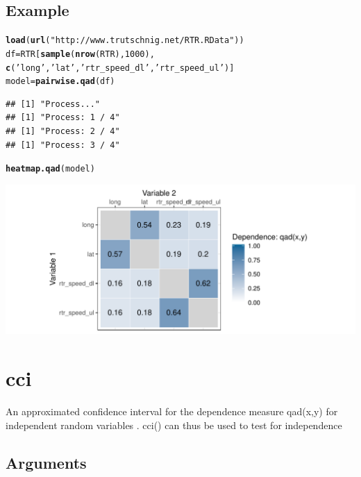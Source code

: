 \documentclass{scrartcl}\usepackage[]{graphicx}\usepackage[]{color}
\makeatletter
\def\maxwidth{ %
  \ifdim\Gin@nat@width>\linewidth
    \linewidth
  \else
    \Gin@nat@width
  \fi
}
\newcommand{\hlnum}[1]{\textcolor[rgb]{0.686,0.059,0.569}{#1}}%
\newcommand{\hlstr}[1]{\textcolor[rgb]{0.192,0.494,0.8}{#1}}%
\newcommand{\hlstd}[1]{\textcolor[rgb]{0.345,0.345,0.345}{#1}}%
\newcommand{\hlkwb}[1]{\textcolor[rgb]{0.69,0.353,0.396}{#1}}%
\newcommand{\hlkwd}[1]{\textcolor[rgb]{0.737,0.353,0.396}{\textbf{#1}}}%
\newenvironment{kframe}{%
 \def\at@end@of@kframe{}%
 \ifinner\ifhmode%
  \def\at@end@of@kframe{\end{minipage}}%
  \begin{minipage}{\columnwidth}%
 \fi\fi%
 \def\FrameCommand##1{\hskip\@totalleftmargin \hskip-\fboxsep
 \colorbox{shadecolor}{##1}\hskip-\fboxsep
     \hskip-\linewidth \hskip-\@totalleftmargin \hskip\columnwidth}%
 \MakeFramed {\advance\hsize-\width
   \@totalleftmargin\z@ \linewidth\hsize
   \@setminipage}}%
 {\par\unskip\endMakeFramed%
 \at@end@of@kframe}
\newenvironment{knitrout}{}{} %
\makeatother
\begin{document}
\subsection{Example}
\begin{knitrout}
\color{fgcolor}\begin{kframe}
\begin{alltt}
  \hlkwd{load}\hlstd{(}\hlkwd{url}\hlstd{(}\hlstr{"http://www.trutschnig.net/RTR.RData"}\hlstd{))}
  \hlstd{df} \hlkwb{=} \hlstd{RTR[}\hlkwd{sample}\hlstd{(}\hlkwd{nrow}\hlstd{(RTR),}\hlnum{1000}\hlstd{),}
           \hlkwd{c}\hlstd{(}\hlstr{'long'}\hlstd{,}\hlstr{'lat'}\hlstd{,}\hlstr{'rtr_speed_dl'}\hlstd{,}\hlstr{'rtr_speed_ul'}\hlstd{)]}
  \hlstd{model} \hlkwb{=} \hlkwd{pairwise.qad}\hlstd{(df)}
\end{alltt}
\begin{verbatim}
## [1] "Process..."
## [1] "Process: 1 / 4"
## [1] "Process: 2 / 4"
## [1] "Process: 3 / 4"
\end{verbatim}
\begin{alltt}
  \hlkwd{heatmap.qad}\hlstd{(model)}
\end{alltt}
\end{kframe}
\includegraphics[width=\maxwidth]{figure/unnamed-chunk-3-1} 

\end{knitrout}

\section{cci}

An approximated confidence interval for the dependence measure qad(x,y) for independent random variables . cci() can thus be used to test for independence

\subsection{Arguments}
\end{document}
